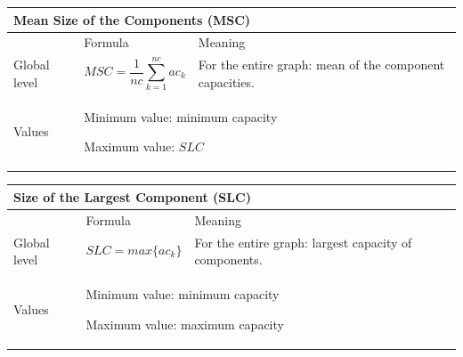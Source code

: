 \documentclass{article}
\begin{document}
\begin{table}[H]
\begin{tabular}{|m{3.24cm}|m{4.4810004cm}m{7.924cm}|}
\hline
\multicolumn{3}{|m{16.044998cm}|}{Mean Size of the Components
(MSC)}\\\hline
 &
\multicolumn{1}{m{4.4810004cm}|}{Formula} &
Meaning\\\hline
Global level &
\multicolumn{1}{m{4.4810004cm}|}{\begin{equation*}
\mathit{MSC}=\frac{1}{\mathit{nc}}\sum
_{k=1}^{\mathit{nc}}{{\mathit{ac}}_{k}}
\end{equation*}
} &
For the entire graph: mean of the component capacities.

\\\hline
Values &
\multicolumn{2}{m{12.6050005cm}|}{Minimum value: minimum capacity

Maximum value:  $\mathit{SLC}$
}\\\hline
\end{tabular}
\end{table}


\begin{table}[H]
\begin{tabular}{|m{3.24cm}|m{4.4810004cm}m{7.924cm}|}
\hline
\multicolumn{3}{|m{16.044998cm}|}{Size of the Largest Component
(SLC)}\\\hline
 &
\multicolumn{1}{m{4.4810004cm}|}{Formula} &
Meaning\\\hline
Global level &
\multicolumn{1}{m{4.4810004cm}|}{\begin{equation*}
\mathit{SLC}=\mathit{max}\{{\mathit{ac}}_{k}\}
\end{equation*}
} &
For the entire graph: largest capacity of components.

\\\hline
Values &
\multicolumn{2}{m{12.6050005cm}|}{Minimum value: minimum capacity

Maximum value: maximum capacity
}\\\hline
\end{tabular}
\end{table}
\end{document}

